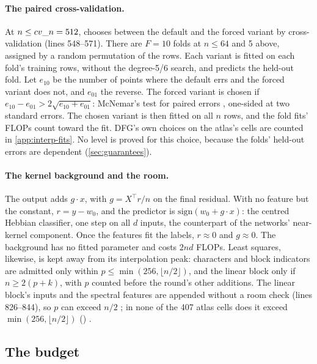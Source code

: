 \paragraph{The paired cross-validation.} At $n\le\code{cv_n}=512$,  chooses between the default and the forced variant by cross-validation (lines 548--571). There are $F=10$ folds at $n\le64$ and 5 above, assigned by a random permutation of the rows. Each variant is fitted on each fold's training rows, without the degree-5/6 search, and predicts the held-out fold. Let $e_{10}$ be the number of points where the default errs and the forced variant does not, and $e_{01}$ the reverse. The forced variant is chosen if $e_{10}-e_{01}>2\sqrt{e_{10}+e_{01}}$: McNemar's test for paired errors \cite{mcnemar1947note}, one-sided at two standard errors. The chosen variant is then fitted on all $n$ rows, and the fold fits' FLOPs count toward the fit. DFG's own choices on the atlas's cells are counted in \cref{app:interp-fits}. No level is proved for this choice, because the folds' held-out errors are dependent (\cref{sec:guarantees}).

\paragraph{The kernel background and the room.} The output adds $g\cdot x$, with $g=X^\top r/n$ on the final residual. With no feature but the constant, $r=y-w_0$, and the predictor is $\mathrm{sign}(w_0+g\cdot x)$: the centred Hebbian classifier, one step on all $d$ inputs, the counterpart of the networks' near-kernel component. Once the features fit the labels, $r\approx0$ and $g\approx0$. The background has no fitted parameter and costs $2nd$ FLOPs. Least squares, likewise, is kept away from its interpolation peak: characters and block indicators are admitted only within $p\le\min(256,\lfloor n/2\rfloor)$, and the linear block only if $n\ge2(p+k)$, with $p$ counted before the round's other additions. The linear block's inputs and the spectral features are appended without a room check (lines 826--844), so $p$ can exceed $n/2$ ; in none of the 407 atlas cells does it exceed $\min(256,\lfloor n/2\rfloor)$ () .

\subsection{The budget}\label{app:learner-budget}

